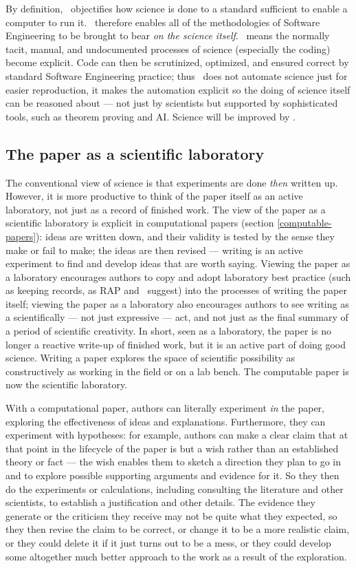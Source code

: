 \documentclass{comjnl}
\begin{document}
By definition, \RAPstar\ objectifies how science is done to a standard sufficient to enable a computer to run it. \RAPstar\ therefore enables all of the methodologies of Software Engineering to be brought to bear \emph{on the science itself}. \RAPstar\ means the normally tacit, manual, and undocumented processes of science (especially the coding) become explicit. Code can then be scrutinized, optimized, and ensured correct by standard Software Engineering practice; thus \RAPstar\ does not automate science just for easier reproduction, it makes the automation explicit so the doing of science itself can be reasoned about --- not just by scientists but supported by sophisticated tools, such as theorem proving and AI\@. Science will be improved by \RAPstar.

\subsection{The paper as a scientific laboratory}\label{paper-as-lab}
The conventional view of science is that experiments are done \emph{then\/} written up. However, it is more productive to think of the paper itself as an active laboratory, not just as a record of finished work. The view of the paper as a scientific laboratory is explicit in computational papers (section \ref{computable-papers}): ideas are written down, and their validity is tested by the sense they make or fail to make; the ideas are then revised --- writing is an active experiment to find and develop ideas that are worth saying. Viewing the paper as a laboratory encourages authors to copy and adopt laboratory best practice (such as keeping records, as RAP and \RAPstar\ suggest) into the processes of writing the paper itself; viewing the paper as a laboratory also encourages authors to see writing as a scientifically --- not just expressive --- act, and not just as the final summary of a period of scientific creativity. In short, seen as a laboratory, the paper is no longer a reactive write-up of finished work, but it is an active part of doing good science. Writing a paper explores the space of scientific possibility as constructively as working in the field or on a lab bench. The computable paper is now the scientific laboratory.

With a computational paper, authors can literally experiment \emph{in\/} the paper, exploring the effectiveness of ideas and explanations. Furthermore, they can experiment with hypotheses: for example, authors can make a clear claim that at that point in the lifecycle of the paper is but a wish rather than an established theory or fact --- the wish enables them to sketch a direction they plan to go in and to explore possible supporting arguments and evidence for it. So they then do the experiments or calculations, including consulting the literature and other scientists, to establish a justification and other details. The evidence they generate or the criticism they receive may not be quite what they expected, so they then revise the claim to be correct, or change it to be a more realistic claim, or they could delete it if it just turns out to be a mess, or they could develop some altogether much better approach to the work as a result of the exploration. 
\end{document}
